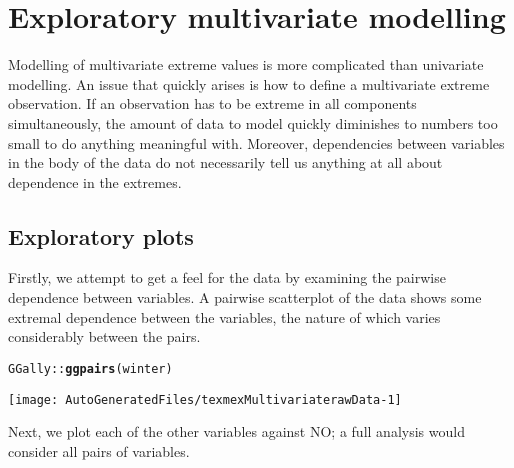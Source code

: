 \documentclass[10pt]{article}\usepackage[]{graphicx}\usepackage[]{color}
\makeatletter
\def\maxwidth{ %
  \ifdim\Gin@nat@width>\linewidth
    \linewidth
  \else
    \Gin@nat@width
  \fi
}
\newcommand{\hlopt}[1]{\textcolor[rgb]{0,0,0}{#1}}%
\newcommand{\hlstd}[1]{\textcolor[rgb]{0.345,0.345,0.345}{#1}}%
\newcommand{\hlkwd}[1]{\textcolor[rgb]{0.737,0.353,0.396}{\textbf{#1}}}%
\newenvironment{kframe}{%
 \def\at@end@of@kframe{}%
 \ifinner\ifhmode%
  \def\at@end@of@kframe{\end{minipage}}%
  \begin{minipage}{\columnwidth}%
 \fi\fi%
 \def\FrameCommand##1{\hskip\@totalleftmargin \hskip-\fboxsep
 \colorbox{shadecolor}{##1}\hskip-\fboxsep
     \hskip-\linewidth \hskip-\@totalleftmargin \hskip\columnwidth}%
 \MakeFramed {\advance\hsize-\width
   \@totalleftmargin\z@ \linewidth\hsize
   \@setminipage}}%
 {\par\unskip\endMakeFramed%
 \at@end@of@kframe}
\newenvironment{knitrout}{}{} %
\makeatother
\begin{document}
%
\section{Exploratory multivariate modelling}
%
Modelling of multivariate extreme values is more complicated
than univariate modelling. An issue that quickly arises is how
to define a multivariate extreme observation. If an
observation has to be extreme in all components simultaneously,
the amount of data to model quickly diminishes to numbers too
small to do anything meaningful with. Moreover, dependencies
between variables in the body of the data do not necessarily
tell us anything at all about dependence in the extremes.
%
\subsection{Exploratory plots}
%
Firstly, we attempt to get a feel for the
data by examining the pairwise  dependence between
variables.  A pairwise scatterplot of the data shows some extremal dependence between
the variables, the nature of which varies considerably between the pairs.

\label{pairsWinter}
\begin{knitrout}
\color{fgcolor}\begin{kframe}
\begin{alltt}
\hlstd{GGally}\hlopt{::}\hlkwd{ggpairs}\hlstd{(winter)}
\end{alltt}
\end{kframe}
\texttt{[image: AutoGeneratedFiles/texmexMultivariaterawData-1]} 

\end{knitrout}

Next, we plot each of the other variables against NO; a full analysis would consider
all pairs of variables.
\end{document}

